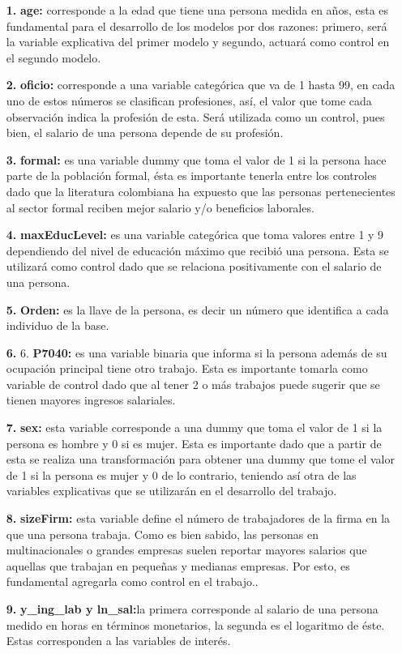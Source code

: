 \documentclass[12pt]{article}
\begin{document}
\begin{enumerate}
    \item [\textbf{1.}] \textbf{age:} corresponde a la edad que tiene una persona medida en años, esta es fundamental para el desarrollo de los modelos por dos razones: primero, será la variable explicativa del primer modelo y segundo, actuará como control en el segundo modelo.
    \item [\textbf{2.}] \textbf{oficio:} corresponde a una variable categórica que va de 1 hasta 99, en cada uno de estos números se clasifican profesiones, así, el valor que tome cada observación indica la profesión de esta. Será utilizada como un control, pues bien, el salario de una persona depende de su profesión.
    \item [\textbf{3.}] \textbf{formal:} es una variable dummy que toma el valor de 1 si la persona hace parte de la población formal, ésta es importante tenerla entre los controles dado que la literatura colombiana ha expuesto que las personas pertenecientes al sector formal reciben mejor salario y/o beneficios laborales.
    \item [\textbf{4.}] \textbf{maxEducLevel:} es una variable categórica que toma valores entre 1 y 9 dependiendo del nivel de educación máximo que recibió una persona. Esta se utilizará como control dado que se relaciona positivamente con el salario de una persona.
    \item [\textbf{5.}] \textbf{Orden:} es la llave de la persona, es decir un número que identifica a cada individuo de la base.
    \item [\textbf{6.}] 6.	\textbf{P7040:} es una variable binaria que informa si la persona además de su ocupación principal tiene otro trabajo. Esta es importante tomarla como variable de control dado que al tener 2 o más trabajos puede sugerir que se tienen mayores ingresos salariales.
    \item [\textbf{7.}] \textbf{sex:} esta variable corresponde a una dummy que toma el valor de 1 si la persona es hombre y 0 si es mujer. Esta es importante dado que a partir de esta se realiza una transformación para obtener una dummy que tome el valor de 1 si la persona es mujer y 0 de lo contrario, teniendo así otra de las variables explicativas que se utilizarán en el desarrollo del trabajo.
    \item [\textbf{8.}] \textbf{sizeFirm:} esta variable define el número de trabajadores de la firma en la que una persona trabaja. Como es bien sabido, las personas en multinacionales o grandes empresas suelen reportar mayores salarios que aquellas que trabajan en pequeñas y medianas empresas. Por esto, es fundamental agregarla como control en el trabajo..
    \item [\textbf{9.}]\textbf{y\_ing\_lab y ln\_sal:}la primera corresponde al salario de una persona medido en horas en términos monetarios, la segunda es el logaritmo de éste. Estas corresponden a las variables de interés. 


\end{enumerate}
\end{document}
